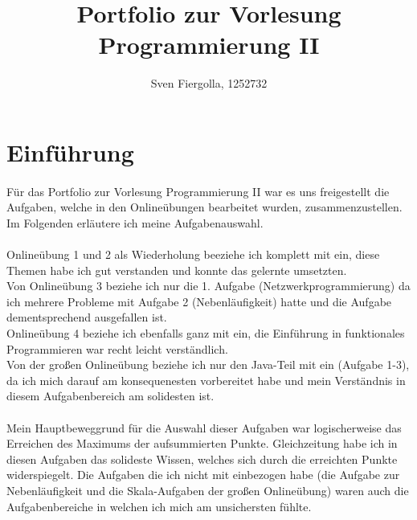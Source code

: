 \documentclass[10pt, a4paper]{article}
\author{Sven Fiergolla, 1252732}
\title{Portfolio zur Vorlesung Programmierung II}
\begin{document}
 

\clearpage\maketitle
\thispagestyle{empty}
\pagebreak


\section*{Einführung}

\paragraph*{}
Für das Portfolio zur Vorlesung Programmierung II war es uns freigestellt die Aufgaben, welche in den Onlineübungen bearbeitet wurden, zusammenzustellen. Im Folgenden erläutere ich meine Aufgabenauswahl.

\paragraph*{}
Onlineübung 1 und 2 als Wiederholung beeziehe ich komplett mit ein, diese Themen habe ich gut verstanden und konnte das gelernte umsetzten.\\
Von Onlineübung 3 beziehe ich nur die 1. Aufgabe (Netzwerkprogrammierung) da ich mehrere Probleme mit Aufgabe 2 (Nebenläufigkeit) hatte und die Aufgabe dementsprechend ausgefallen ist.\\
Onlineübung 4 beziehe ich ebenfalls ganz mit ein, die Einführung in funktionales Programmieren war recht leicht verständlich.\\
Von der großen Onlineübung beziehe ich nur den Java-Teil mit ein (Aufgabe 1-3), da ich mich darauf am konsequenesten vorbereitet habe und mein Verständnis in diesem Aufgabenbereich am solidesten ist.\par

\paragraph*{}
Mein Hauptbeweggrund für die Auswahl dieser Aufgaben war logischerweise das Erreichen des Maximums der aufsummierten Punkte. Gleichzeitung habe ich in diesen Aufgaben das solideste Wissen, welches sich durch die erreichten Punkte widerspiegelt. Die Aufgaben die ich nicht mit einbezogen habe (die Aufgabe zur Nebenläufigkeit und die Skala-Aufgaben der großen Onlineübung) waren auch die Aufgabenbereiche in welchen ich mich am unsichersten fühlte. \par
\end{document}

